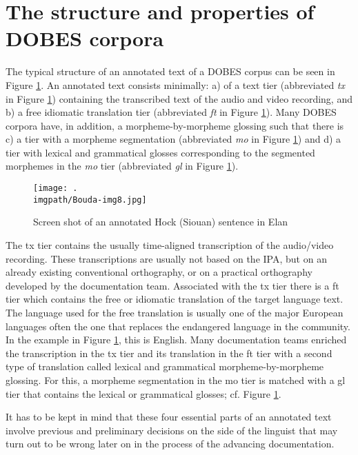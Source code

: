 \section{The structure and properties of DOBES corpora}%
\label{bouda:sec:structureandproperties}
The typical structure of an annotated text of a DOBES corpus can be seen in Figure  \ref{bouda:fig:corpussentence}. An annotated text consists minimally: a) of a text tier (abbreviated \textit{tx} in Figure \ref{bouda:fig:corpussentence}) containing the transcribed text of the audio and video recording, and b) a free idiomatic translation tier (abbreviated \textit{ft} in Figure  \ref{bouda:fig:corpussentence}). Many DOBES corpora have, in addition, a morpheme-by-morpheme glossing such that there is c) a tier with a morpheme segmentation (abbreviated \textit{mo} in Figure  \ref{bouda:fig:corpussentence}) and d) a tier with lexical and grammatical glosses corresponding to the segmented morphemes in the \textit{mo} tier (abbreviated \textit{gl} in Figure  \ref{bouda:fig:corpussentence}).

\begin{figure}
\texttt{[image: .\\imgpath/Bouda-img8.jpg]}
\caption{Screen shot of an annotated Hoc{\A}k (Siouan) sentence in Elan}
\label{bouda:fig:corpussentence}
\end{figure}



The tx tier contains the usually time-aligned transcription of the audio/video recording. These transcriptions are usually not based on the IPA, but on an already existing conventional orthography, or on a practical orthography developed by the documentation team. Associated with the tx tier there is a ft tier which contains the free or idiomatic translation of the target language text. The language used for the free translation is usually one of the major European languages often the one that replaces the endangered language in the community. In the example in Figure  \ref{bouda:fig:corpussentence}, this is English. Many documentation teams enriched the transcription in the tx tier and its translation in the ft tier with a second type of translation called lexical and grammatical morpheme-by-morpheme glossing. For this, a morpheme segmentation in the mo tier is matched with a gl tier that contains the lexical or grammatical glosses; cf. Figure  \ref{bouda:fig:corpussentence}.

It has to be kept in mind that these four essential parts of an annotated text involve previous and preliminary decisions on the side of the linguist that may turn out to be wrong later on in the process of the advancing documentation.


